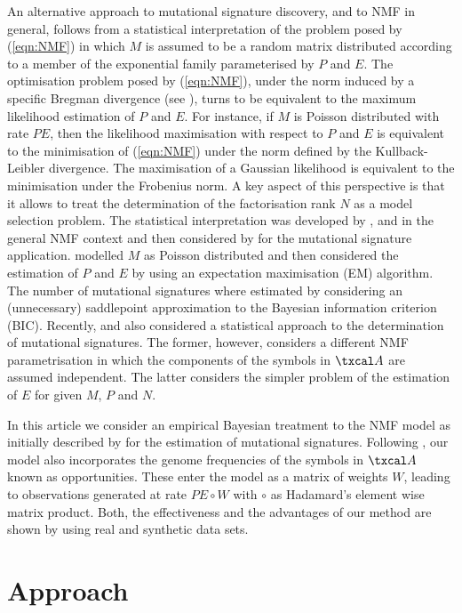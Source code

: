 \documentclass{bioinfo}
\begin{document}
An alternative approach to mutational signature discovery, and to NMF
in general, follows from a statistical interpretation of the problem
posed by (\ref{eqn:NMF}) in which $M$ is assumed to be a random matrix
distributed according to a member of the exponential family
parameterised by $P$ and $E$. The optimisation problem posed by
(\ref{eqn:NMF}), under the norm induced by a specific Bregman
divergence (see \citealp{BMD}), turns to be equivalent to the maximum
likelihood estimation of $P$ and $E$.  For instance, if $M$ is Poisson
distributed with rate $PE$, then the likelihood maximisation with
respect to $P$ and $E$ is equivalent to the minimisation of
(\ref{eqn:NMF}) under the norm defined by the Kullback-Leibler
divergence. The maximisation of a Gaussian likelihood is equivalent to
the minimisation under the Frobenius norm. A key aspect of this
perspective is that it allows to treat the determination of the
factorisation rank $N$ as a model selection problem. The statistical
interpretation was developed by \cite{C}, \cite{FC} and \cite{SWK} in
the general NMF context and then considered by \cite{FICMV} for the
mutational signature application. \cite{FICMV} modelled $M$ as Poisson
distributed and then considered the estimation of $P$ and $E$ by using
an expectation maximisation (EM) algorithm. The number of mutational
signatures where estimated by considering an (unnecessary) saddlepoint
approximation to the Bayesian information criterion (BIC). Recently,
\cite{STMS} and \cite{RMHTS} also considered a statistical approach to
the determination of mutational signatures. The former, however,
considers a different NMF parametrisation in which the components of
the symbols in $\txcal A$ are assumed independent. The latter
considers the simpler problem of the estimation of $E$ for given $M$,
$P$ and $N$.

In this article we consider an empirical Bayesian treatment to the NMF
model as initially described by \cite{A} for the estimation of
mutational signatures. Following \cite{FICMV}, our model also
incorporates the genome frequencies of the symbols in $\txcal A$ known
as opportunities. These enter the model as a matrix of weights $W$,
leading to observations generated at rate $PE\circ W$ with $\circ$ as
Hadamard's element wise matrix product. Both, the effectiveness and
the advantages of our method are shown by using real and synthetic
data sets.

\section{Approach}
\end{document}
